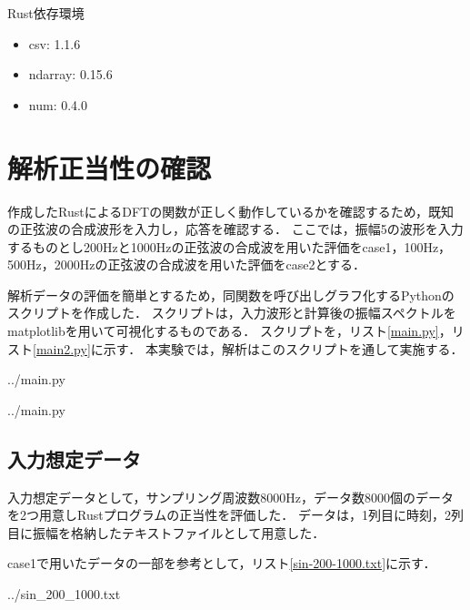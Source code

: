 \documentclass[dvipdfmx,titlepage,a4j]{jsarticle}  %
\begin{document}
Rust依存環境
\begin{itemize}
  \item csv: 1.1.6
  \item ndarray: 0.15.6
  \item num: 0.4.0
\end{itemize}

\section{解析正当性の確認}
作成したRustによるDFTの関数が正しく動作しているかを確認するため，既知の正弦波の合成波形を入力し，応答を確認する．
ここでは，振幅5の波形を入力するものとし200Hzと1000Hzの正弦波の合成波を用いた評価をcase1，100Hz，500Hz，2000Hzの正弦波の合成波を用いた評価をcase2とする．

解析データの評価を簡単とするため，同関数を呼び出しグラフ化するPythonのスクリプトを作成した．
スクリプトは，入力波形と計算後の振幅スペクトルをmatplotlibを用いて可視化するものである．
スクリプトを，リスト\ref{main.py}，リスト\ref{main2.py}に示す．
本実験では，解析はこのスクリプトを通して実施する．


{../main.py}

{../main.py}

\subsection{入力想定データ}
入力想定データとして，サンプリング周波数$8000$Hz，データ数$8000$個のデータを2つ用意しRustプログラムの正当性を評価した．
データは，1列目に時刻，2列目に振幅を格納したテキストファイルとして用意した．

case1で用いたデータの一部を参考として，リスト\ref{sin-200-1000.txt}に示す．

{../sin_200_1000.txt}
\end{document}
